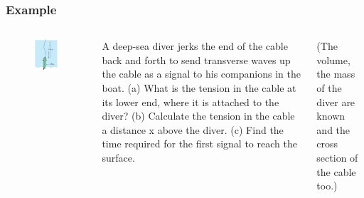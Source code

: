 \documentclass[]{beamer}
\begin{document}


\begin{frame}
  \frametitle{Example \theexample} 


  \begin{columns}[c]
    \column{2in}  %
 
    \begin{figure}[h!]
      \begin{center}
        \includegraphics[height=2.in]{images4/15_84.jpg}
      \end{center}
    \end{figure}
    \column{2in}
 
 
    A deep-sea
    diver  jerks the end
    of the cable back and forth to
    send transverse waves up the
    cable as a signal to his companions
    in the boat. (a) What is the tension in the cable at its lower end,
    where it is attached to the diver?  (b)
    Calculate the tension in the cable a distance x above the diver.  (c)
    Find the time  required for the first signal to reach the surface.
  
    (The volume, the mass of the diver are known and the cross section of the cable too.)
  

    
    \end{columns}




  

\end{frame}



\end{document}
